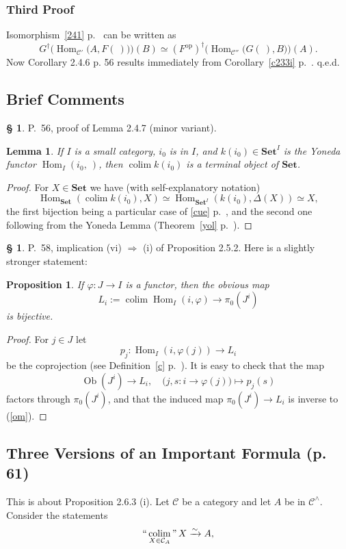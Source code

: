 \documentclass[12pt]{article}
\newtheorem{lem}[thm]{Lemma}
\newtheorem{prop}[thm]{Proposition}
\theoremstyle{remark}
\theoremstyle{definition}
\newtheorem{s}[thm]{\S}
\newcommand{\C}{\mathcal C}
\newcommand{\Set}{\mathbf{Set}}
\newcommand{\mv}{ (minor variant)}
\newcommand{\bc}{\subsection{Brief Comments}}
\newcommand{\then}{\Rightarrow}
\DeclareMathOperator*{\coli}{colim}
\DeclareMathOperator*{\ic}{``\coli"}
\DeclareMathOperator{\Hom}{Hom}%
\DeclareMathOperator{\Ob}{Ob}
\DeclareMathOperator{\op}{op}
\begin{document}
\subsubsection{Third Proof}
%
Isomorphism~\eqref{241} p.~\pageref{241} can be written as 
$$
G^\dagger\Big(\Hom_{\C'}\big(A,F(\ )\big)\Big)(B)\simeq
(F^{\op})^\dagger\Big(\Hom_{\C''}\big(G(\ ),B\big)\Big)(A).
$$ 
Now Corollary 2.4.6 p. 56 results immediately from Corollary~\ref{c233i} p.~\pageref{c233i}. q.e.d.
%
%
\bc
%
\begin{s} 
P.~56, proof of Lemma 2.4.7\mv.
%
\begin{lem} 
If $I$ is a small category, $i_0$ is in $I$, and $k(i_0)\in\Set^I$ is the Yoneda functor $\Hom_I(i_0,\ )$, then $\coli k(i_0)$ is a terminal object of $\Set$. 
\end{lem}
%
\begin{proof}
For $X\in\Set$ we have (with self-explanatory notation)
$$
\Hom_{\Set}\left(\coli k(i_0),X\right)\simeq\Hom_{{\Set}^I}(k(i_0),\Delta(X))\simeq X,
$$
the first bijection being a particular case of \eqref{cue} p.~\pageref{cue}, and the second one following from the Yoneda Lemma (Theorem~\ref{yol} p.~\pageref{yol}).
\end{proof}
\end{s}
%
%
\begin{s} 
P.~58, implication (vi) $\then$ (i) of Proposition 2.5.2. Here is a slightly stronger statement:
%
\begin{prop} 
If $\varphi:J\to I$ is a functor, then the obvious map
\begin{equation}\label{om}
L_i:=\coli\Hom_I(i,\varphi)\to\pi_0(J^i)
\end{equation}
is bijective. 
\end{prop}
% 
\begin{proof}
For $j\in J$ let 
$$
p_j:\Hom_I(i,\varphi(j))\to L_i
$$
be the coprojection (see Definition~\ref{c} p.~\pageref{c}). It is easy to check that the map 
$$
\Ob(J^i)\to L_i,\quad\big(j,s:i\to\varphi(j)\big)\mapsto p_j(s)
$$
factors through $\pi_0(J^i)$, and that the induced map $\pi_0(J^i)\to L_i$ is inverse to (\ref{om}).
\end{proof}
\end{s}
%
%
\subsection{Three Versions of an Important Formula (p. 61)}
%
This is about Proposition 2.6.3 (i). Let $\C$ be a category and let $A$ be in $\C^\wedge$. Consider the statements
%
\begin{equation}\label{263a}
\ic_{X\in\C_A}X\xrightarrow\sim A,
\end{equation} 
\end{document}

